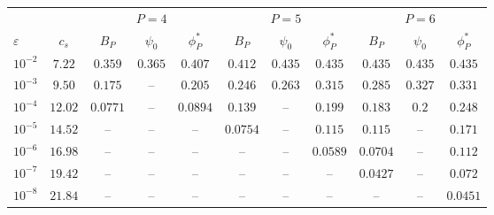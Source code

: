 \begin{tabular}{@{}lcccccccccc@{}}
\toprule
 & & \multicolumn{3}{c}{$P=4$} & \multicolumn{3}{c}{$P=5$} & \multicolumn{3}{c}{$P=6$}\\
\cmidrule(lr){3-5}\cmidrule(lr){6-8}\cmidrule(lr){9-11}
$\varepsilon$ & $c_s$ & $B_P$ & $\psi_0$ & $\phi_P^*$ & $B_P$ & $\psi_0$ & $\phi_P^*$ & $B_P$ & $\psi_0$ & $\phi_P^*$\\
\midrule
$10^{-2}$ & $7.22$ & $0.359$ & $0.365$ & $0.407$ & $0.412$ & $0.435$ & $0.435$ & $0.435$ & $0.435$ & $0.435$\\
$10^{-3}$ & $9.50$ & $0.175$ & -- & $0.205$ & $0.246$ & $0.263$ & $0.315$ & $0.285$ & $0.327$ & $0.331$\\
$10^{-4}$ & $12.02$ & $0.0771$ & -- & $0.0894$ & $0.139$ & -- & $0.199$ & $0.183$ & $0.2$ & $0.248$\\
$10^{-5}$ & $14.52$ & -- & -- & -- & $0.0754$ & -- & $0.115$ & $0.115$ & -- & $0.171$\\
$10^{-6}$ & $16.98$ & -- & -- & -- & -- & -- & $0.0589$ & $0.0704$ & -- & $0.112$\\
$10^{-7}$ & $19.42$ & -- & -- & -- & -- & -- & -- & $0.0427$ & -- & $0.072$\\
$10^{-8}$ & $21.84$ & -- & -- & -- & -- & -- & -- & -- & -- & $0.0451$\\
\bottomrule
\end{tabular}
